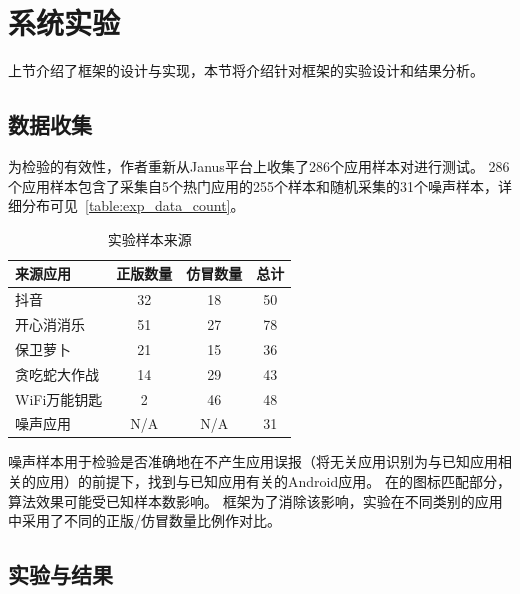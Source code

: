 \section{系统实验}

上节介绍了框架的设计与实现，本节将介绍针对框架的实验设计和结果分析。

\subsection{数据收集}

为检验\mytool 的有效性，作者重新从Janus平台上收集了286个应用样本对\mytool 进行测试。
286个应用样本包含了采集自5个热门应用的255个样本和随机采集的31个噪声样本，详细分布可见~\autoref{table:exp_data_count}。

\begin{table}[htbp]
    \renewcommand{\arraystretch}{1}
    \footnotesize
    \centering
    \caption{\mytool 实验样本来源}
    \vspace{1mm}
    \begin{tabular}{l ccc}
        \toprule
        {\bf 来源应用} & {\bf 正版数量} & {\bf 仿冒数量} & {\bf 总计} \\
        \midrule
        抖音           & 32             & 18             & 50         \\
        开心消消乐     & 51             & 27             & 78         \\
        保卫萝卜       & 21             & 15             & 36         \\
        贪吃蛇大作战   & 14             & 29             & 43         \\
        WiFi万能钥匙   & 2              & 46             & 48         \\
        噪声应用       & N/A            & N/A            & 31         \\
        \bottomrule
    \end{tabular}
    \label{table:exp_data_count}
\end{table}

噪声样本用于检验\mytool 是否准确地在不产生应用误报（将无关应用识别为与已知应用相关的应用）的前提下，找到与已知应用有关的Android应用。
在\componentA 的图标匹配部分，算法效果可能受已知样本数影响。
框架为了消除该影响，实验在不同类别的应用中采用了不同的正版/仿冒数量比例作对比。

\subsection{实验与结果}

